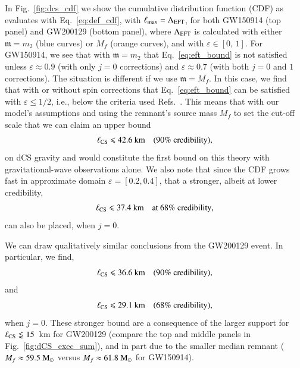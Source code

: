 \documentclass[twocolumn,
               prd,
               aps,
               superscriptaddress,
               tightenlines,
               nofootinbib,
               eqsecnum,
               amsfonts,
               amsmath,
               longbibliography]{revtex4-1}
\newcommand{\gm}{\mathfrak{m}}
\newcommand{\msun}{~{\rm M}_{\odot}}
\begin{document}
In Fig.~\ref{fig:dcs_cdf} we show the cumulative distribution function (CDF) as
evaluates with Eq.~\eqref{eq:def_cdf}, with $\ell_{\rm max} = \Lambda_{\rm EFT}$,
for both GW150914 (top panel) and GW200129 (bottom panel), where $\Lambda_{\rm EFT}$
is calculated with either $\mathfrak{m} = m_2$ (blue curves) or $M_{f}$ (orange curves),
and with $\varepsilon \in [0,\, 1]$.
%
For GW150914, we see that with $\gm = m_2$ that Eq.~\eqref{eq:eft_bound} is not
satisfied unless $\varepsilon \approx 0.9$ (with only $j=0$ corrections) and
$\varepsilon \approx 0.7$ (with both $j=0$ and $1$ corrections).
%
The situation is different if we use $\gm = M_f$. In this case, we find that
with or without spin corrections that Eq.~\eqref{eq:eft_bound} can be satisfied
with $\varepsilon \leqslant 1/2$, i.e., below the criteria used
Refs.~\cite{Nair:2019iur,Perkins:2021mhb,Lyu:2022gdr}.
%
This means that with our model's assumptions and using the remnant's source mass $M_f$ to set the
cut-off scale that we can claim an upper bound
%
\begin{equation}
\ell_{\rm CS} \leqslant 42.6~\textrm{km}
\quad \textrm{(90\% credibility)},
\end{equation}
%
on dCS gravity and would constitute the first bound on this theory with
gravitational-wave observations alone.
%
We also note that since the CDF grows fast in approximate domain $\varepsilon = [0.2, 0.4]$,
that a stronger, albeit at lower credibility,
%
\begin{equation}
\ell_{\rm CS} \leqslant 37.4~\textrm{km}
\quad \textrm{at 68\% credibility},
\end{equation}
%
can also be placed, when $j=0$.

We can draw qualitatively similar conclusions from the GW200129 event.
In particular, we find,
%
\begin{equation}
\ell_{\rm CS} \leqslant 36.6~\textrm{km}
\quad \textrm{(90\% credibility)},
\end{equation}
%
and
%
\begin{equation}
\ell_{\rm CS} \leqslant 29.1~\textrm{km}
\quad \textrm{(68\% credibility)},
\end{equation}
%
when $j=0$.
%
These stronger bound are a consequence of the larger support for $\ell_{\rm CS} \lessapprox 15$~km
for GW200129 (compare the top and middle panels in Fig.~\ref{fig:dCS_exec_sum}), and in part due to
the smaller median remnant ($M_{f} \approx 59.5\msun$ versus $M_{f} \approx 61.8\msun$ for GW150914).
\end{document}
